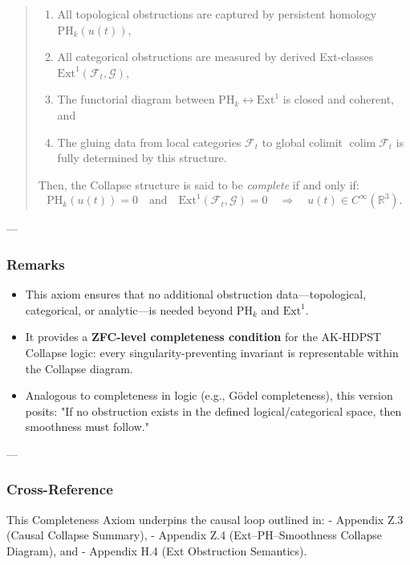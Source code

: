 \documentclass[11pt]{article}
\DeclareMathOperator{\colim}{colim}
\begin{document}
\begin{axiom}
\begin{axiom}
{{\begin{quote}
\begin{enumerate}
  \item All topological obstructions are captured by persistent homology \(\mathrm{PH}_k(u(t))\),
  \item All categorical obstructions are measured by derived Ext-classes \(\mathrm{Ext}^1(\mathcal{F}_t, \mathcal{G})\),
  \item The functorial diagram between \(\mathrm{PH}_k \leftrightarrow \mathrm{Ext}^1\) is closed and coherent, and
  \item The gluing data from local categories \(\mathcal{F}_t\) to global colimit \(\colim \mathcal{F}_t\) is fully determined by this structure.
\end{enumerate}

Then, the Collapse structure is said to be \emph{complete} if and only if:
\[
\mathrm{PH}_k(u(t)) = 0 \quad \text{and} \quad \mathrm{Ext}^1(\mathcal{F}_t, \mathcal{G}) = 0 \quad \Longrightarrow \quad u(t) \in C^\infty(\mathbb{R}^3).
\]
\end{quote}

---

\subsubsection*{Remarks}

\begin{itemize}
  \item This axiom ensures that no additional obstruction data—topological, categorical, or analytic—is needed beyond \(\mathrm{PH}_k\) and \(\mathrm{Ext}^1\).
  \item It provides a \textbf{ZFC-level completeness condition} for the AK-HDPST Collapse logic:  
  every singularity-preventing invariant is representable within the Collapse diagram.
  \item Analogous to completeness in logic (e.g., Gödel completeness), this version posits:  
  "If no obstruction exists in the defined logical/categorical space, then smoothness must follow."
\end{itemize}

---

\subsubsection*{Cross-Reference}

This Completeness Axiom underpins the causal loop outlined in:
- Appendix Z.3 (Causal Collapse Summary),
- Appendix Z.4 (Ext–PH–Smoothness Collapse Diagram), and
- Appendix H.4 (Ext Obstruction Semantics).

}}
\end{axiom}
\end{axiom}
\end{document}
